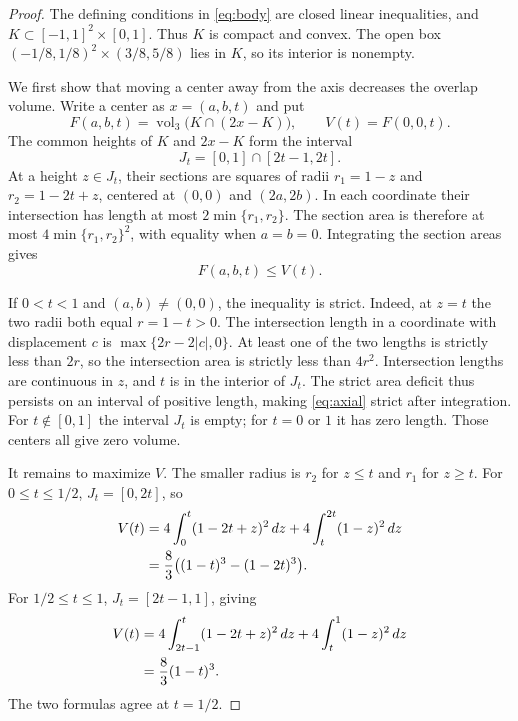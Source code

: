 \documentclass[11pt]{article}
\newcommand{\vol}{\operatorname{vol}}
\begin{document}
\begin{proof}
The defining conditions in \eqref{eq:body} are closed linear inequalities,
and $K\subset[-1,1]^2\times[0,1]$. Thus $K$ is compact and convex.
The open box
$(-1/8,1/8)^2\times(3/8,5/8)$ lies in $K$, so its interior is nonempty.

We first show that moving a center away from the axis decreases the overlap
volume. Write a center as $x=(a,b,t)$ and put
\[
 F(a,b,t)=\vol_3\bigl(K\cap(2x-K)\bigr),\qquad V(t)=F(0,0,t).
\]
The common heights of $K$ and $2x-K$ form the interval
\[
 J_t=[0,1]\cap[2t-1,2t].
\]
At a height $z\in J_t$, their sections are squares of radii
$r_1=1-z$ and $r_2=1-2t+z$, centered at $(0,0)$ and $(2a,2b)$.
In each coordinate their intersection has length at most
$2\min\{r_1,r_2\}$. The section area is therefore at most
$4\min\{r_1,r_2\}^2$, with equality when $a=b=0$.
Integrating the section areas gives
\begin{equation}\label{eq:axial}
 F(a,b,t)\le V(t).
\end{equation}

If $0<t<1$ and $(a,b)\ne(0,0)$, the inequality is strict.
Indeed, at $z=t$ the two radii both equal $r=1-t>0$.
The intersection length in a coordinate with displacement $c$ is
$\max\{2r-2|c|,0\}$. At least one of the two lengths is strictly
less than $2r$, so the intersection area is strictly less than $4r^2$.
Intersection lengths are continuous in $z$, and $t$ is in the interior
of $J_t$. The strict area deficit thus persists on an interval of positive
length, making \eqref{eq:axial} strict after integration.
For $t\notin[0,1]$ the interval $J_t$ is empty; for $t=0$ or $1$ it
has zero length. Those centers all give zero volume.

It remains to maximize $V$. The smaller radius is $r_2$ for $z\le t$
and $r_1$ for $z\ge t$. For $0\le t\le1/2$, $J_t=[0,2t]$, so
\begin{align}
 V(t)
 &=4\int_0^t(1-2t+z)^2\,dz
   +4\int_t^{2t}(1-z)^2\,dz\notag\\
 &=\frac83\bigl((1-t)^3-(1-2t)^3\bigr).
 \label{eq:first}
\end{align}
For $1/2\le t\le1$, $J_t=[2t-1,1]$, giving
\begin{align}
 V(t)
 &=4\int_{2t-1}^t(1-2t+z)^2\,dz
   +4\int_t^1(1-z)^2\,dz\notag\\
 &=\frac83(1-t)^3.
 \label{eq:second}
\end{align}
The two formulas agree at $t=1/2$.


\end{proof}
\end{document}
